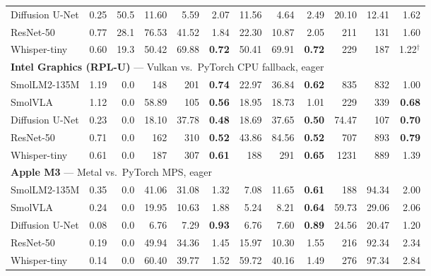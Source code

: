 \begin{tabular}{l rr rrr rrr rrr}
Diffusion U-Net & 0.25 & 50.5 & 11.60 & 5.59 & 2.07 & 11.56 & 4.64 & 2.49 & 20.10 & 12.41 & 1.62 \\
ResNet-50 & 0.77 & 28.1 & 76.53 & 41.52 & 1.84 & 22.30 & 10.87 & 2.05 & 211 & 131 & 1.60 \\
Whisper-tiny & 0.60 & 19.3 & 50.42 & 69.88 & \textbf{0.72} & 50.41 & 69.91 & \textbf{0.72} & 229 & 187 & 1.22$^\dagger$ \\
\midrule
\multicolumn{12}{l}{\textbf{Intel Graphics (RPL-U)} --- \system{} Vulkan vs.\ PyTorch CPU fallback, eager} \\
SmolLM2-135M & 1.19 & 0.0 & 148 & 201 & \textbf{0.74} & 22.97 & 36.84 & \textbf{0.62} & 835 & 832 & 1.00 \\
SmolVLA & 1.12 & 0.0 & 58.89 & 105 & \textbf{0.56} & 18.95 & 18.73 & 1.01 & 229 & 339 & \textbf{0.68} \\
Diffusion U-Net & 0.23 & 0.0 & 18.10 & 37.78 & \textbf{0.48} & 18.69 & 37.65 & \textbf{0.50} & 74.47 & 107 & \textbf{0.70} \\
ResNet-50 & 0.71 & 0.0 & 162 & 310 & \textbf{0.52} & 43.86 & 84.56 & \textbf{0.52} & 707 & 893 & \textbf{0.79} \\
Whisper-tiny & 0.61 & 0.0 & 187 & 307 & \textbf{0.61} & 188 & 291 & \textbf{0.65} & 1231 & 889 & 1.39 \\
\midrule
\multicolumn{12}{l}{\textbf{Apple M3} --- \system{} Metal vs.\ PyTorch MPS, eager} \\
SmolLM2-135M & 0.35 & 0.0 & 41.06 & 31.08 & 1.32 & 7.08 & 11.65 & \textbf{0.61} & 188 & 94.34 & 2.00 \\
SmolVLA & 0.24 & 0.0 & 19.95 & 10.63 & 1.88 & 5.24 & 8.21 & \textbf{0.64} & 59.73 & 29.06 & 2.06 \\
Diffusion U-Net & 0.08 & 0.0 & 6.76 & 7.29 & \textbf{0.93} & 6.76 & 7.60 & \textbf{0.89} & 24.56 & 20.47 & 1.20 \\
ResNet-50 & 0.19 & 0.0 & 49.94 & 34.36 & 1.45 & 15.97 & 10.30 & 1.55 & 216 & 92.34 & 2.34 \\
Whisper-tiny & 0.14 & 0.0 & 60.40 & 39.77 & 1.52 & 59.72 & 40.16 & 1.49 & 276 & 97.34 & 2.84 \\
\bottomrule
\end{tabular}
